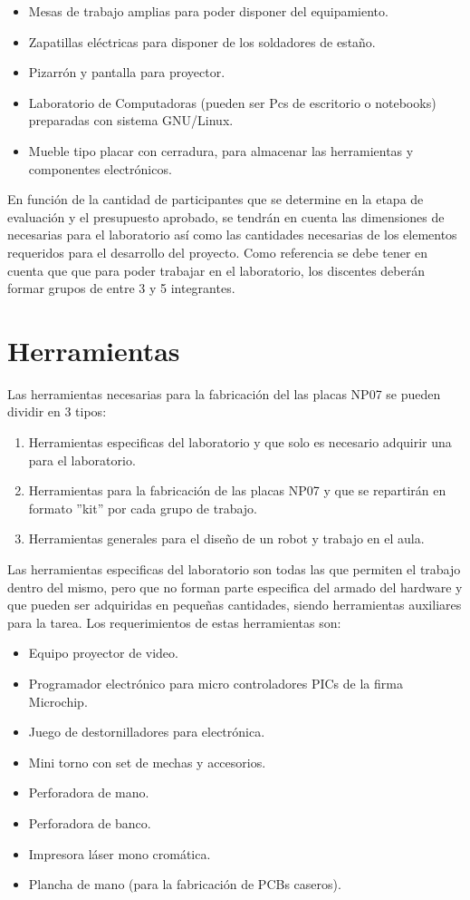 \begin{itemize}
  \item Mesas de trabajo amplias para poder disponer del equipamiento.
  \item Zapatillas eléctricas para disponer de los soldadores de estaño.
  \item Pizarrón y pantalla para proyector.
  \item Laboratorio de Computadoras (pueden ser Pcs de escritorio o notebooks) preparadas con sistema GNU/Linux.
  \item Mueble tipo placar con cerradura, para almacenar las herramientas y componentes electrónicos. 
\end{itemize}

En función de la cantidad de participantes que se determine en la etapa de evaluación y el presupuesto aprobado, se tendrán en cuenta las dimensiones de necesarias para el laboratorio así como las cantidades necesarias de los elementos requeridos para el desarrollo del proyecto. Como referencia se debe tener en cuenta que que para poder trabajar en el laboratorio, los discentes deberán formar grupos de entre 3 y 5 integrantes. 

\section{Herramientas}

Las herramientas necesarias para la fabricación del las placas NP07 se pueden dividir en 3 tipos: 

\begin{enumerate}
  \item Herramientas especificas del laboratorio y que solo es necesario adquirir una para el laboratorio.
  \item Herramientas para la fabricación de las placas NP07 y que se repartirán en formato ''kit'' por cada grupo de trabajo.
  \item Herramientas generales para el diseño de un robot y trabajo en el aula.
\end{enumerate}

Las herramientas especificas del laboratorio son todas las que permiten el trabajo dentro del mismo, pero que no forman parte especifica del armado del hardware y que pueden ser adquiridas en pequeñas cantidades, siendo herramientas auxiliares para la tarea. Los requerimientos de estas herramientas son:

\begin{itemize}
  \item Equipo proyector de video.
  \item Programador electrónico para micro controladores PICs de la firma Microchip\textregistered.
  \item Juego de destornilladores para electrónica.
  \item Mini torno con set de mechas y accesorios.
  \item Perforadora de mano.
  \item Perforadora de banco.
  \item Impresora láser mono cromática.
  \item Plancha de mano (para la fabricación de PCBs caseros).
\end{itemize}


